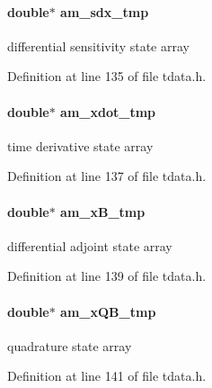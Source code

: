 \paragraph[{am\+\_\+sdx\+\_\+tmp}]{\setlength{\rightskip}{0pt plus 5cm}double$\ast$ am\+\_\+sdx\+\_\+tmp}\label{struct_temp_data_a6882e67247f0ba606bea7beb58e06a2a}
differential sensitivity state array 

Definition at line 135 of file tdata.\+h.

\hypertarget{struct_temp_data_afb2731c31bf77c871d0900fb39e8ab16}{}
\paragraph[{am\+\_\+xdot\+\_\+tmp}]{\setlength{\rightskip}{0pt plus 5cm}double$\ast$ am\+\_\+xdot\+\_\+tmp}\label{struct_temp_data_afb2731c31bf77c871d0900fb39e8ab16}
time derivative state array 

Definition at line 137 of file tdata.\+h.

\hypertarget{struct_temp_data_adbc8603c1bf4ed31b70d605383186bc1}{}
\paragraph[{am\+\_\+x\+B\+\_\+tmp}]{\setlength{\rightskip}{0pt plus 5cm}double$\ast$ am\+\_\+x\+B\+\_\+tmp}\label{struct_temp_data_adbc8603c1bf4ed31b70d605383186bc1}
differential adjoint state array 

Definition at line 139 of file tdata.\+h.

\hypertarget{struct_temp_data_a6dd23f804ac266653883f23ef4ac7686}{}
\paragraph[{am\+\_\+x\+Q\+B\+\_\+tmp}]{\setlength{\rightskip}{0pt plus 5cm}double$\ast$ am\+\_\+x\+Q\+B\+\_\+tmp}\label{struct_temp_data_a6dd23f804ac266653883f23ef4ac7686}
quadrature state array 

Definition at line 141 of file tdata.\+h.

